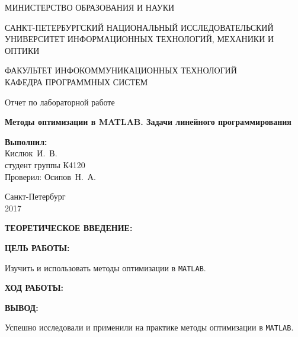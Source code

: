 \documentclass[14pt,a4paper]{extreport}
\newcommand{\header}[1]{%
{
\clearpage%
\fontsize{16pt}{14pt}\selectfont
\begin{center}
\textbf{\MakeUppercase{#1}:}
\end{center}
}
}
\newcommand{\matlab}{\texttt{\MakeUppercase{matlab}}}
\newcommand{\labyear}{2017}
\newcommand{\labtitle}{Методы оптимизации в \MakeUppercase{Matlab}. Задачи линейного программирования}
\newcommand{\prepod}{Осипов~Н.~А.}
\newcommand{\student}{Кислюк~И.~В.}
\begin{document}
	\begin{titlepage}
	\begin{center}	
		\fontsize{14pt}{14pt}\selectfont
		МИНИСТЕРСТВО ОБРАЗОВАНИЯ И НАУКИ\\

		\vspace*{0.6\baselineskip}

		\MakeUppercase{Санкт-Петербургский Национальный Исследовательский Университет Информационных технологий, механики и оптики}		
		
		\vspace*{0.6\baselineskip}
		\MakeUppercase{Факультет Инфокоммуникационных технологий}\\
		\MakeUppercase{Кафедра программных систем}
	
		\vspace*{7\baselineskip}
		\fontsize{19pt}{18pt}\selectfont
		Отчет по лабораторной работе
		
		\fontsize{20pt}{18pt}\selectfont
		\textbf{\labtitle}\\
		\vspace*{1.15\baselineskip}
		\end{center}
	
	\vspace*{2\baselineskip}
	\begin{flushright}
	\fontsize{14pt}{14pt}\selectfont
	\textbf{Выполнил:}\\
	\student\\
	студент группы К4120\\
	Проверил: \prepod\\
	\end{flushright}
	
	\vspace{\fill}
	\begin{center}
	Санкт-Петербург\\
	\vspace{-1ex}
	\labyear
	\end{center}
	
\end{titlepage}

\fontsize{14pt}{14pt}\selectfont

\header{Теоретическое введение}


\header{Цель работы}

Изучить и использовать методы оптимизации в \matlab.

\header{Ход работы}


\header{Вывод}

Успешно исследовали и применили на практике методы оптимизации в \matlab .
\end{document}
